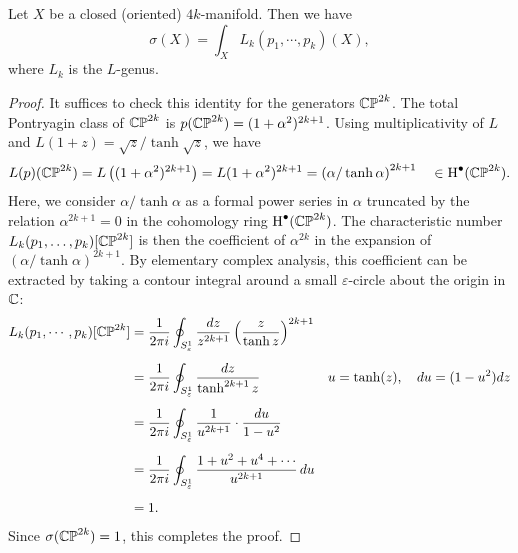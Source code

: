 \begin{theorem}\label{thm:hirzebruch_signature}
	Let $X$ be a closed (oriented) $4k$-manifold. Then we have
	\[
		\sigma(X) = \int_X L_k(p_1, \cdots, p_k)(X),
	\]
	where $L_k$ is the $L$-genus.
\end{theorem}
\begin{proof}
	It suffices to check this identity for the generators $\mathbb{CP}^{2k}$. The total Pontryagin class of $\mathbb{CP}^{2k}$ is $p(\mathbb{CP}^{2k})=(1+\alpha^2)^{2k+1}$. Using multiplicativity of $L$ and $L(1+z)=\sqrt{z}/\tanh\sqrt{z}$, we have
	\[
		\begin{aligned}
			L(p)(\mathbb{CP}^{2k})
			= L\left((1+\alpha^2)^{2k+1}\right)
			= L(1+\alpha^2)^{2k+1}
			= \left(\alpha/\tanh \alpha\right)^{2k+1}
			\quad\in\operatorname{H}^\bullet(\mathbb{CP}^{2k}).
		\end{aligned}
	\]
	Here, we consider $\alpha/\tanh \alpha$ as a formal power series in $\alpha$ truncated by the relation $\alpha^{2k+1}=0$ in the cohomology ring $\operatorname{H}^\bullet(\mathbb{CP}^{2k})$. The characteristic number $L_k(p_1,\ldots,p_k)[\mathbb{CP}^{2k}]$ is then the coefficient of $\alpha^{2k}$ in the expansion of $(\alpha/\tanh \alpha)^{2k+1}$.
	By elementary complex analysis, this coefficient can be extracted by taking a contour integral around a small $\varepsilon$-circle about the origin in $\mathbb{C}$:
	\[
		\begin{aligned}
			L_k(p_1,\cdots, p_k)[\mathbb{CP}^{2k}]
			 & = \frac{1}{2\pi i}\oint_{S^1_\varepsilon} \frac{dz}{z^{2k+1}} \left(\frac{z}{\tanh z}\right)^{2k+1}
			 &                                                                                                       \\[0.5em]
			 & = \frac{1}{2\pi i}\oint_{S^1_\varepsilon} \frac{dz}{\tanh^{2k+1} z}\quad
			 & u  =\tanh(z),\quad
			du =(1-u^2)dz
			\\[0.5em]
			 & = \frac{1}{2\pi i}\oint_{S^1_\varepsilon} \frac{1}{u^{2k+1}}\cdot\frac{du}{1-u^2}
			 &                                                                                                       \\[0.5em]
			 & = \frac{1}{2\pi i}\oint_{S^1_\varepsilon} \frac{1+u^2+u^4+\cdots}{u^{2k+1}}\,du                       \\[0.5em]
			 & =1.                                                                                                 &
		\end{aligned}
	\]
	Since $\sigma(\mathbb{CP}^{2k})=1$, this completes the proof.
\end{proof}

